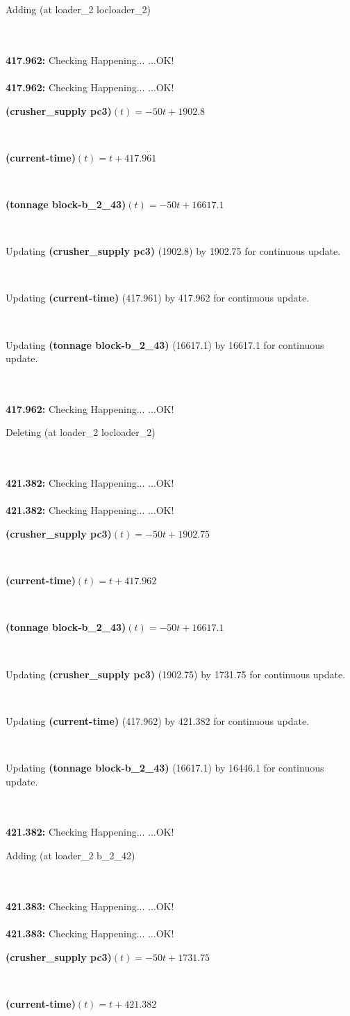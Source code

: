 \documentclass[a4paper,12pt]{article}
\newcommand{\atime}[1]{{\bf #1:}}
\newcommand{\exprn}[1]{{\sf #1}}
\newcommand{\fexprn}[1]{{\small {\bf #1}}}
\newcommand{\checkhappening}{Checking Happening... }
\newcommand{\listrow}[1]{\begin{minipage}[t]{11.5cm} #1 \end{minipage}}
\newcommand{\happeningOK}{...OK!}
\newcommand{\assignmentcts}[3]{\listrow{Updating \fexprn{#1} (#2) by #3 for continuous update.}}
\newcommand{\function}[2]{\listrow{\fexprn{#1}$(t) = #2$}}
\newcommand{\adding}[1]{\listrow{Adding \exprn{#1} }}
\newcommand{\deleting}[1]{\listrow{Deleting \exprn{#1} }}
\begin{document}
\begin{tabbing}
 \> \adding{(at loader\_2 locloader\_2)}\\
\\
\atime{417.962} \> \checkhappening\happeningOK\\
\\
\atime{417.962} \> \checkhappening\happeningOK\\
 \> \function{(crusher\_supply pc3)}{ - 50t + 1902.8}\\
 \> \function{(current-time)}{t + 417.961}\\
 \> \function{(tonnage block-b\_2\_43)}{ - 50t + 16617.1}\\
 \> \assignmentcts{(crusher\_supply pc3)}{1902.8}{1902.75}\\
 \> \assignmentcts{(current-time)}{417.961}{417.962}\\
 \> \assignmentcts{(tonnage block-b\_2\_43)}{16617.1}{16617.1}\\
\\
\atime{417.962} \> \checkhappening\happeningOK\\
 \> \deleting{(at loader\_2 locloader\_2)}\\
\\
\atime{421.382} \> \checkhappening\happeningOK\\
\\
\atime{421.382} \> \checkhappening\happeningOK\\
 \> \function{(crusher\_supply pc3)}{ - 50t + 1902.75}\\
 \> \function{(current-time)}{t + 417.962}\\
 \> \function{(tonnage block-b\_2\_43)}{ - 50t + 16617.1}\\
 \> \assignmentcts{(crusher\_supply pc3)}{1902.75}{1731.75}\\
 \> \assignmentcts{(current-time)}{417.962}{421.382}\\
 \> \assignmentcts{(tonnage block-b\_2\_43)}{16617.1}{16446.1}\\
\\
\atime{421.382} \> \checkhappening\happeningOK\\
 \> \adding{(at loader\_2 b\_2\_42)}\\
\\
\atime{421.383} \> \checkhappening\happeningOK\\
\\
\atime{421.383} \> \checkhappening\happeningOK\\
 \> \function{(crusher\_supply pc3)}{ - 50t + 1731.75}\\
 \> \function{(current-time)}{t + 421.382}\\

\end{tabbing}
\end{document}
